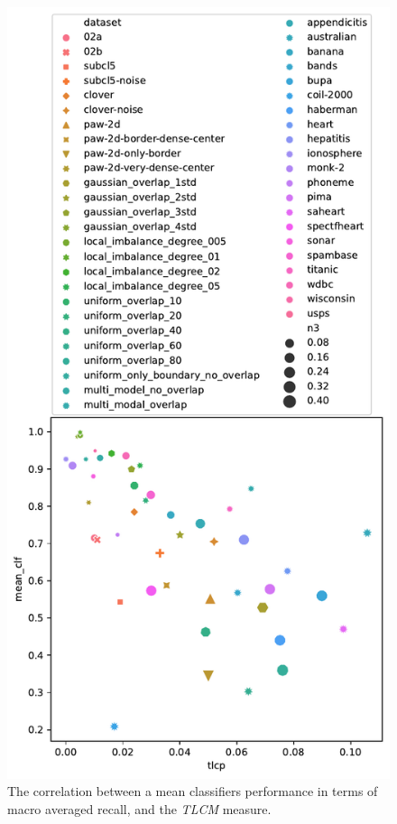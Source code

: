 \begin{figure}[tbp]
\centering
\includegraphics[width=0.8\columnwidth]{../plots/dataset_plots/siam_full_plot_tlcp.pdf}
\caption{The correlation between a mean classifiers performance in terms of macro averaged recall, and the \emph{TLCM} measure.}
\label{fig:tlcp_dataset_plot}
\end{figure}
